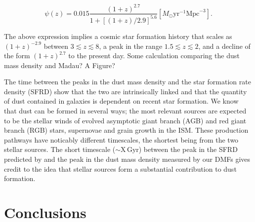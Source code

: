 \begin{equation}
    \psi(z) = 0.015\frac{(1+z)^{2.7}}{1+[(1+z)/2.9]^{5.6}} [M_{\odot}\textrm{yr}^{-1}\textrm{Mpc}^{-3}].
    \label{eq:madau_sfrd}
\end{equation}

The above expression implies a cosmic star formation history that scales as $(1+z)^{-2.9}$ between $3 \lesssim z \lesssim 8$, a peak in the range $1.5 \lesssim z \lesssim 2$, and a decline of the form $(1+z)^{2.7}$ to the present day. {\color{red}Some calculation comparing the dust mass density and Madau? A Figure?}

The time between the peaks in the dust mass density and the star formation rate density (SFRD) show that the two are intrinsically linked and that the quantity of dust contained in galaxies is dependent on recent star formation. We know that dust can be formed in several ways; the most relevant sources are expected to be the stellar winds of evolved asymptotic giant branch (AGB) and red giant branch (RGB) stars, supernovae and grain growth in the ISM. These production pathways have noticably different timescales, the shortest being from the two stellar sources. The short timescale ($\sim${\color{red}X}\,Gyr) between the peak in the SFRD predicted by \citealt{Madau_2014} and the peak in the dust mass density measured by our DMFs gives credit to the idea that stellar sources form a substantial contribution to dust formation. 

\section{Conclusions}
